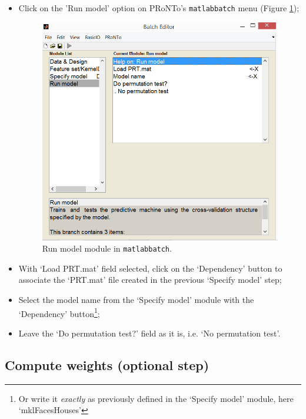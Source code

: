 \begin{itemize}

	\item Click on the 'Run model' option on PRoNTo's {\tt matlabbatch} menu (Figure \ref{fig:batchRunMKL});
	
	\begin{figure}[!h]
	\centering
		\includegraphics[scale=0.6]{images/Tutorial/mkl/batchRunMKL.png}
	\caption{Run model module in {\tt matlabbatch}.}
	\label{fig:batchRunMKL}
\end{figure}
	
	
	\item  With `Load PRT.mat' field selected, click on the `Dependency' button to associate the `PRT.mat' file created in the previous `Specify model' step;
	
	\item Select the model name from the `Specify model' module with the `Dependency' button\footnote{Or write it {\it exactly} as previously defined in the `Specify model' module, here `mklFacesHouses'};

	\item  Leave the `Do permutation test?' field as it is, i.e. `No permutation test'.

\end{itemize}

\subsection{Compute weights (optional step)}

